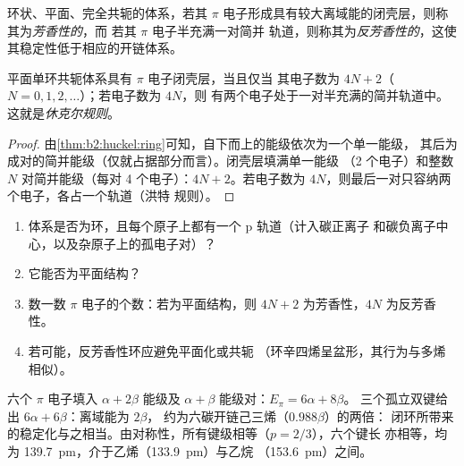 \begin{definition}[芳香性]\label{def:b2:huckel:aromatic}
环状、平面、完全共轭的体系，若其
$\pi$ 电子形成具有较大离域能的闭壳层，则称其为\emph{芳香性的}，而
若其 $\pi$ 电子半充满一对简并
轨道，则称其为\emph{反芳香性的}，这使其稳定性低于相应的开链体系。
\end{definition}

\begin{theorem}[休克尔规则]\label{thm:b2:huckel:huckel-rule}
平面单环共轭体系具有 $\pi$ 电子闭壳层，当且仅当
其电子数为 $4N + 2$（$N = 0, 1, 2, \dots$）；若电子数为 $4N$，则
有两个电子处于一对半充满的简并轨道中。这就是\emph{休克尔规则}。
\end{theorem}

\begin{proof}
由\cref{thm:b2:huckel:ring}可知，自下而上的能级依次为一个单一能级，
其后为成对的简并能级（仅就占据部分而言）。闭壳层填满单一能级
（2 个电子）和整数 $N$ 对简并能级（每对 4 个电子）：$4N + 2$。若电子数为
$4N$，则最后一对只容纳两个电子，各占一个轨道（洪特
规则）。
\end{proof}

\begin{method}[是否芳香？]\label{met:b2:huckel:aromaticity}
\begin{enumerate}
  \item 体系是否为环，且每个原子上都有一个 p 轨道（计入碳正离子
        和碳负离子中心，以及杂原子上的孤电子对）？
  \item 它能否为平面结构？
  \item 数一数 $\pi$ 电子的个数：若为平面结构，则 $4N + 2$ 为芳香性，$4N$ 为反芳香性。
  \item 若可能，反芳香性环应避免平面化或共轭
        （环辛四烯呈盆形，其行为与多烯相似）。
\end{enumerate}
\end{method}

\begin{example}[苯]\label{ex:b2:huckel:benzene}
六个 $\pi$ 电子填入 $\alpha + 2\beta$ 能级及 $\alpha + \beta$ 能级对：$E_\pi = 6\alpha + 8\beta$。
三个孤立双键给出 $6\alpha + 6\beta$：离域能为 $2\beta$，
约为六碳开链己三烯（$0.988\beta$）的两倍：
闭环所带来的稳定化与之相当。由对称性，所有键级相等（$p = 2/3$），六个键长
亦相等，均为 \qty{139.7}{pm}，介于乙烯（\qty{133.9}{pm}）与乙烷
（\qty{153.6}{pm}）之间。
\end{example}

